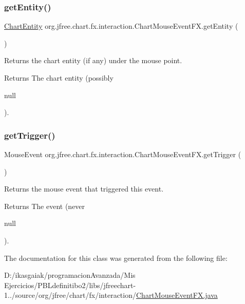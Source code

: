 \subsubsection{\texorpdfstring{get\+Entity()}{getEntity()}}
{\footnotesize\ttfamily \mbox{\hyperlink{classorg_1_1jfree_1_1chart_1_1entity_1_1_chart_entity}{Chart\+Entity}} org.\+jfree.\+chart.\+fx.\+interaction.\+Chart\+Mouse\+Event\+F\+X.\+get\+Entity (\begin{DoxyParamCaption}{ }\end{DoxyParamCaption})}

Returns the chart entity (if any) under the mouse point.

\begin{DoxyReturn}{Returns}
The chart entity (possibly
\begin{DoxyCode}
null 
\end{DoxyCode}
 ). 
\end{DoxyReturn}
\mbox{\label{classorg_1_1jfree_1_1chart_1_1fx_1_1interaction_1_1_chart_mouse_event_f_x_a05a72468115fe95df8b8a17058513d8a}} 
\subsubsection{\texorpdfstring{get\+Trigger()}{getTrigger()}}
{\footnotesize\ttfamily Mouse\+Event org.\+jfree.\+chart.\+fx.\+interaction.\+Chart\+Mouse\+Event\+F\+X.\+get\+Trigger (\begin{DoxyParamCaption}{ }\end{DoxyParamCaption})}

Returns the mouse event that triggered this event.

\begin{DoxyReturn}{Returns}
The event (never
\begin{DoxyCode}
null 
\end{DoxyCode}
 ). 
\end{DoxyReturn}


The documentation for this class was generated from the following file\+:\begin{DoxyCompactItemize}
\item 
D\+:/ikasgaiak/programacion\+Avanzada/\+Mis Ejercicios/\+P\+B\+Ldefinitibo2/libs/jfreechart-\/1../source/org/jfree/chart/fx/interaction/\mbox{\hyperlink{_chart_mouse_event_f_x_8java}{Chart\+Mouse\+Event\+F\+X.\+java}}\end{DoxyCompactItemize}
